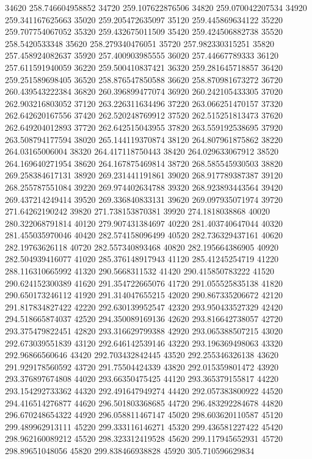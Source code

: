 {34620 258.746604958852
34720 259.107622876506
34820 259.070042207534
34920 259.341167625663
35020 259.205472635097
35120 259.445869634122
35220 259.707754067052
35320 259.432675011509
35420 259.424506882738
35520 258.5420533348
35620 258.279340476051
35720 257.982330315251
35820 257.458924082637
35920 257.400903985555
36020 257.44667789333
36120 257.611591940059
36220 259.500410837421
36320 259.281645718857
36420 259.251589698405
36520 258.876547850588
36620 258.870981673272
36720 260.439543222384
36820 260.396899477074
36920 260.242105433305
37020 262.903216803052
37120 263.226311634496
37220 263.066251470157
37320 262.642620167556
37420 262.520248769912
37520 262.515251813473
37620 262.649204012893
37720 262.642515043955
37820 263.559192538695
37920 263.508794177594
38020 265.144119370874
38120 264.807961875862
38220 264.03165006004
38320 264.417118750443
38420 264.029633067912
38520 264.169640271954
38620 264.167875469814
38720 268.585545930503
38820 269.258384617131
38920 269.231441191861
39020 268.917789387387
39120 268.255787551084
39220 269.974402634788
39320 268.923893443564
39420 269.437214249414
39520 269.336840833131
39620 269.097935071974
39720 271.64262190242
39820 271.738153870381
39920 274.1818038868
40020 280.322068791814
40120 279.907431384697
40220 281.403740647044
40320 281.455035970046
40420 282.574158096499
40520 282.736329437161
40620 282.19763626118
40720 282.557340893468
40820 282.195664386905
40920 282.504939416077
41020 285.376148917943
41120 285.41245254719
41220 288.116310665992
41320 290.5668311532
41420 290.415850783222
41520 290.624152300389
41620 291.354722665076
41720 291.055525835138
41820 290.650173246112
41920 291.314047655215
42020 290.867335206672
42120 291.817834827422
42220 292.630139952547
42320 293.950433527329
42420 294.518665874037
42520 294.350089169136
42620 293.816642738057
42720 293.375479822451
42820 293.316629799388
42920 293.065388507215
43020 292.673039551839
43120 292.646142539146
43220 293.196369498063
43320 292.96866560646
43420 292.703432842445
43520 292.255346326138
43620 291.929178560592
43720 291.75504424339
43820 292.015359801472
43920 293.376897674808
44020 293.66350475425
44120 293.365379155817
44220 293.154292733362
44320 292.491647949274
44420 292.057383800922
44520 294.416514276877
44620 296.501803368685
44720 296.483292284678
44820 296.670248654322
44920 296.058811467147
45020 298.603620110587
45120 299.489962913111
45220 299.333116146271
45320 299.436581227422
45420 298.962160089212
45520 298.323312419528
45620 299.117945652931
45720 298.89651048056
45820 299.838466938828
45920 305.710596629834
}

